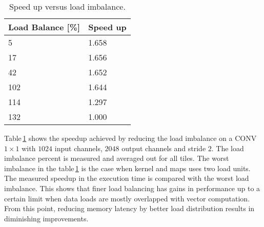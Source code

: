 \documentclass{sig-alternate}
\begin{document}
\begin{table}[h]
\centering
\caption{Speed up versus load imbalance.}
\label{tab:ldbal}
\begin{tabular}{|l|l|}
\hline
Load Balance {[}\%{]} & Speed up \\ \hline
5 & 1.658 \\ \hline
17 & 1.656 \\ \hline
42 & 1.652 \\ \hline
102 & 1.644 \\ \hline
114 & 1.297 \\ \hline
132 & 1.000 \\ \hline
\end{tabular}
\end{table}

Table\,\ref{tab:ldbal} shows the speedup achieved by reducing the load imbalance on a CONV $1\times1$ with $1024$ input channels, $2048$ output channels and stride $2$. The load imbalance percent is measured and averaged out for all tiles. The worst imbalance in the table\,\ref{tab:ldbal} is the case when kernel and maps uses two load units. The measured speedup in the execution time is compared with the worst load imbalance. This shows that finer load balancing has gains in performance up to a certain limit when data loads are mostly overlapped with vector computation. From this point, reducing memory latency by better load distribution results in diminishing improvements.





\end{document}
